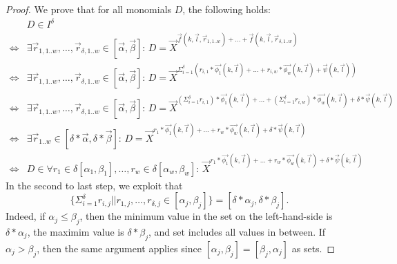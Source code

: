 \begin{proof}
We prove that for all monomials $D$, the following holds:
\begin{align*}
   & D \in I^{\delta} \\
%
{}\Leftrightarrow{} &
  \exists \vec{r}_{1,1..w},\ldots,\vec{r}_{\delta,1..w} \in [\vec{\alpha}, \vec{\beta}]:\,
    D = \vec{X}^{\vec{f}(k,\vec{l},\vec{r}_{1,1..w}) + \ldots + \vec{f}(k,\vec{l},\vec{r}_{\delta,1..w}) } \\
%
{}\Leftrightarrow{} &
  \exists \vec{r}_{1,1..w},\ldots,\vec{r}_{\delta,1..w} \in [\vec{\alpha}, \vec{\beta}]:\,
    D = \vec{X}^{ \Sigma_{i=1}^{\delta} (r_{i,1}*\vec{\phi_1}(k,\vec{l}) + \ldots + r_{i,w}*\vec{\phi_w}(k,\vec{l})
                  + \vec{\psi}(k,\vec{l}))
                } \\
{}\Leftrightarrow{} &
  \exists \vec{r}_{1,1..w},\ldots,\vec{r}_{\delta,1..w} \in [\vec{\alpha}, \vec{\beta}]:\,
    D = \vec{X}^{   (\Sigma_{i=1}^{\delta} r_{i,1})*\vec{\phi_1}(k,\vec{l}) + \ldots
                  + (\Sigma_{i=1}^{\delta} r_{i,w})*\vec{\phi_w}(k,\vec{l})
                  + \delta*\vec{\psi}(k,\vec{l})
                } \\
{}\Leftrightarrow{} &
  \exists \vec{r}_{1..w} \in [\delta * \vec{\alpha}, \delta * \vec{\beta}]:\,
    D = \vec{X}^{   r_{1}*\vec{\phi_1}(k,\vec{l}) + \ldots
                  + r_{w}*\vec{\phi_w}(k,\vec{l})
                  + \delta*\vec{\psi}(k,\vec{l})
                } \\
{}\Leftrightarrow{} &
  D \in \forall r_1 \in \delta[\alpha_1, \beta_1], \ldots, r_w \in \delta[\alpha_w, \beta_w]:\,
    \vec{X}^{r_{1}*\vec{\phi_1}(k,\vec{l}) + \ldots + r_{w}*\vec{\phi_w}(k,\vec{l}) + \delta*\vec{\psi}(k,\vec{l})}
%
\end{align*}
In the second to last step, we exploit that
\[
   \{ \Sigma_{i=1}^{\delta} r_{i,j} | \mid r_{1,j}, \ldots, r_{\delta,j} \in [\alpha_j, \beta_j] \}
   = [\delta*\alpha_j, \delta*\beta_j]\text{.}
\]
Indeed, if $\alpha_j \leq \beta_j$, then the minimum value in the set on the left-hand-side
  is $\delta*\alpha_j$, the maximim value is $\delta*\beta_j$, and set includes all values
  in between.
If $\alpha_j > \beta_j$, then the same argument applies since $[\alpha_j,\beta_j] = [\beta_j,\alpha_j]$
  as sets.  
\end{proof}
